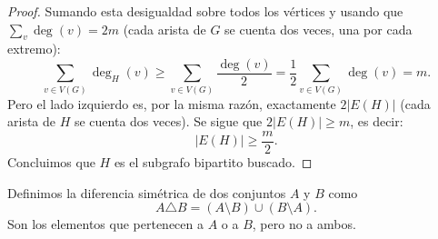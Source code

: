 \begin{proof}
    Sumando esta desigualdad sobre todos los vértices y usando que \(\sum_{v} \deg(v) = 2m\) (cada arista de \(G\) se cuenta dos veces, una por cada extremo):
    \[
        \sum_{v \in V(G)} \deg_H(v) \geq \sum_{v \in V(G)} \frac{\deg(v)}{2} = \frac{1}{2} \sum_{v \in V(G)} \deg(v) = m.
    \]
    Pero el lado izquierdo es, por la misma razón, exactamente \(2|E(H)|\) (cada arista de \(H\) se cuenta dos veces). Se sigue que \(2|E(H)| \geq m\), es decir:
    \[
        |E(H)| \geq \frac{m}{2}.
    \]
    Concluimos que \(H\) es el subgrafo bipartito buscado.
\end{proof}

\vspace{0.5cm}

\begin{definition}
    Definimos la diferencia simétrica de dos conjuntos \(A\) y \(B\) como
    \[
        A \triangle B = (A \setminus B) \cup (B \setminus A).
    \]
    Son los elementos que pertenecen a \( A \) o a \( B \), pero no a ambos.
\end{definition}

